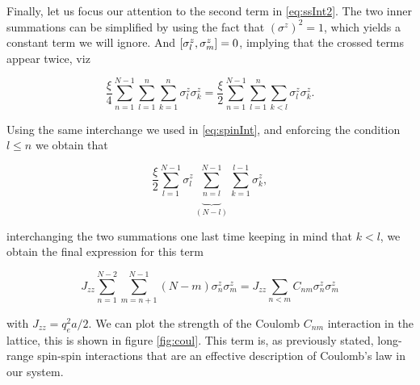Finally, let us focus our attention to the second term in \eqref{eq:ssInt2}. The two inner summations can be simplified by using the fact that $(\sigma^z)^2 = 1$, which yields a constant term we will ignore. And $\comm{\sigma^z_l}{\sigma^z_m}=0$, implying that the crossed terms appear twice, viz

\begin{equation}
\frac{\xi}{4} \sum_{n=1}^{N-1}\sum_{l=1}^{n}\sum_{k=1}^{n}\sigma^z_l\sigma^z_k = \frac{\xi}{2} \sum_{n=1}^{N-1}\sum_{l=1}^{n}\sum_{k<l}\sigma^z_l\sigma^z_k.
\end{equation}



Using the same interchange we used in \eqref{eq:spinInt}, and enforcing the condition $l\leq n$ we obtain that

\begin{equation}
\frac{\xi}{2} \sum_{l=1}^{N-1}\sigma^z_l\underbrace{\sum_{n=l}^{N-1}}_{(N-l)}\sum_{k=1}^{l-1}\sigma^z_k,
\end{equation}

interchanging the two summations one last time keeping in mind that $k<l$, we obtain the final expression for this term

\begin{equation}
J_{zz} \sum_{n=1}^{N-2}\sum_{m=n+1}^{N-1}(N-m)\sigma^z_n\sigma^z_m = J_{zz} \sum_{n<m}C_{nm}\sigma^z_n\sigma^z_m
\end{equation}

with $J_{zz} = q_e^2a/2$. We can plot the strength of the Coulomb $C_{nm}$ interaction in the lattice, this is shown in figure \ref{fig:coul}. This term is, as previously stated, long-range spin-spin interactions that are an effective description of Coulomb's law in our system.

